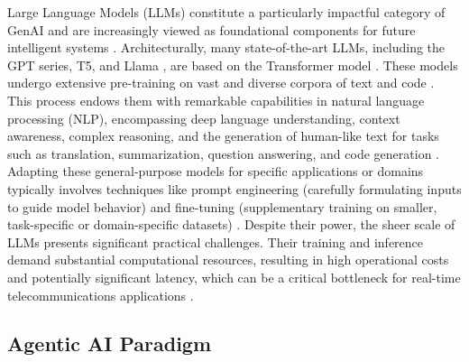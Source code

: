 \documentclass[sigconf]{acmart}
\begin{document}
Large Language Models (LLMs) constitute a particularly impactful category of GenAI and are increasingly viewed as foundational components for future intelligent systems \cite{ref16}. Architecturally, many state-of-the-art LLMs, including the GPT series, T5, and Llama \cite{ref8}, are based on the Transformer model \cite{ref2, ref8, ref9, ref18, ref25}. These models undergo extensive pre-training on vast and diverse corpora of text and code \cite{ref8, ref25}. This process endows them with remarkable capabilities in natural language processing (NLP), encompassing deep language understanding, context awareness, complex reasoning, and the generation of human-like text for tasks such as translation, summarization, question answering, and code generation \cite{ref9, ref21, ref25}. Adapting these general-purpose models for specific applications or domains typically involves techniques like prompt engineering (carefully formulating inputs to guide model behavior) and fine-tuning (supplementary training on smaller, task-specific or domain-specific datasets) \cite{ref8, ref18, ref25}. Despite their power, the sheer scale of LLMs presents significant practical challenges. Their training and inference demand substantial computational resources, resulting in high operational costs and potentially significant latency, which can be a critical bottleneck for real-time telecommunications applications \cite{ref14}.

\subsection{Agentic AI Paradigm}
\end{document}
